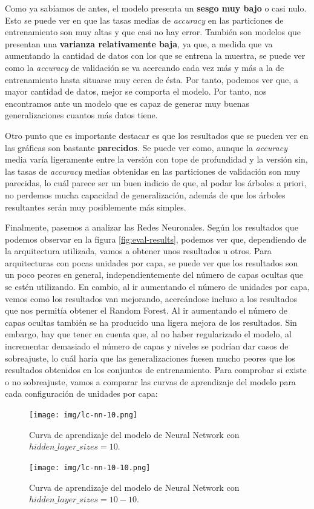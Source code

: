 \documentclass[11pt,a4paper]{article}
\begin{document}
Como ya sabíamos de antes, el modelo presenta un \textbf{sesgo muy bajo} o casi nulo. Esto se puede ver en que las tasas medias de \textit{accuracy} en las
particiones de entrenamiento son muy altas y que casi no hay error. También son modelos que presentan una \textbf{varianza relativamente baja}, ya que, a
medida que va aumentando la cantidad de datos con los que se entrena la muestra, se puede ver como la \textit{accuracy} de validación se va
acercando cada vez más y más a la de entrenamiento hasta situarse muy cerca de ésta. Por tanto, podemos ver que, a mayor cantidad de datos, mejor se
comporta el modelo. Por tanto, nos encontramos ante un modelo que es capaz de generar muy buenas generalizaciones cuantos más datos tiene.

Otro punto que es importante destacar es que los resultados que se pueden ver en las gráficas son bastante \textbf{parecidos}. Se puede ver como, aunque
la \textit{accuracy} media varía ligeramente entre la versión con tope de profundidad y la versión sin, las tasas de \textit{accuracy} medias
obtenidas en las particiones de validación son muy parecidas, lo cuál parece ser un buen indicio de que, al podar los árboles a priori, no perdemos
mucha capacidad de generalización, además de que los árboles resultantes serán muy posiblemente más simples.

Finalmente, pasemos a analizar las Redes Neuronales. Según los resultados que podemos observar en la figura \ref{fig:eval-results}, podemos ver que,
dependiendo de la arquitectura utilizada, vamos a obtener unos resultados u otros. Para arquitecturas con pocas unidades por capa, se puede ver
que los resultados son un poco peores en general, independientemente del número de capas ocultas que se estén utilizando. En cambio, al ir aumentando
el número de unidades por capa, vemos como los resultados van mejorando, acercándose incluso a los resultados que nos permitía obtener el Random
Forest. Al ir aumentando el número de capas ocultas también se ha producido una ligera mejora de los resultados. Sin embargo, hay que tener en
cuenta que, al no haber regularizado el modelo, al incrementar demasiado el número de capas y niveles se podrían dar casos de sobreajuste, lo
cuál haría que las generalizaciones fuesen mucho peores que los resultados obtenidos en los conjuntos de entrenamiento. Para comprobar si existe
o no sobreajuste, vamos a comparar las curvas de aprendizaje del modelo para cada configuración de unidades por capa:

\begin{figure}[H]
\centering
\begin{minipage}{.5\textwidth}
    \centering
    \texttt{[image: img/lc-nn-10.png]}
    \caption{Curva de aprendizaje del modelo de Neural Network con $hidden\_layer\_sizes=10$.}
    \label{fig:lc-nn-10}
\end{minipage}%
\begin{minipage}{.5\textwidth}
    \centering
    \texttt{[image: img/lc-nn-10-10.png]}
    \caption{Curva de aprendizaje del modelo de Neural Network con $hidden\_layer\_sizes=10-10$.}
    \label{fig:lc-nn-10-10}
\end{minipage}
\end{figure}
\end{document}
